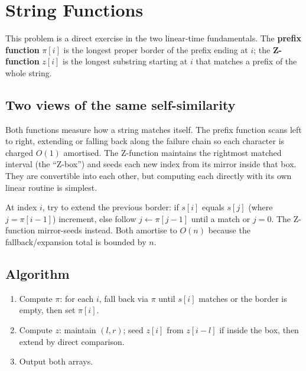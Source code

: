 \section{String Functions}
\label{sec:cses-string-functions}


\begin{patternbox}
This problem is a direct exercise in the two linear-time fundamentals.
The \textbf{prefix function} $\pi[i]$ is the longest proper border of the
prefix ending at $i$; the \textbf{Z-function} $z[i]$ is the longest
substring starting at $i$ that matches a prefix of the whole string.
\end{patternbox}

\subsection*{Two views of the same self-similarity}

Both functions measure how a string matches itself. The prefix function
scans left to right, extending or falling back along the failure chain so
each character is charged $O(1)$ amortised. The Z-function maintains the
rightmost matched interval (the ``Z-box'') and seeds each new index from
its mirror inside that box. They are convertible into each other, but
computing each directly with its own linear routine is simplest.

\begin{ideabox}
At index $i$, try to extend the previous border: if $s[i]$ equals
$s[j]$ (where $j=\pi[i-1]$) increment, else follow $j\gets\pi[j-1]$ until a
match or $j=0$. The Z-function mirror-seeds instead. Both amortise to
$O(n)$ because the fallback/expansion total is bounded by $n$.
\end{ideabox}

\subsection*{Algorithm}

\begin{enumerate}
  \item Compute $\pi$: for each $i$, fall back via $\pi$ until $s[i]$
        matches or the border is empty, then set $\pi[i]$.
  \item Compute $z$: maintain $(l,r)$; seed $z[i]$ from $z[i-l]$ if inside
        the box, then extend by direct comparison.
  \item Output both arrays.
\end{enumerate}

